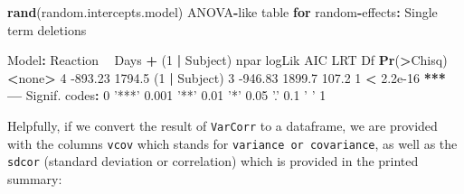 \documentclass[]{article}
\newenvironment{Shaded}{\begin{snugshade}}{\end{snugshade}}
\newcommand{\CommentTok}[1]{\textcolor[rgb]{0.56,0.35,0.01}{\textit{#1}}}
\newcommand{\ControlFlowTok}[1]{\textcolor[rgb]{0.13,0.29,0.53}{\textbf{#1}}}
\newcommand{\DataTypeTok}[1]{\textcolor[rgb]{0.13,0.29,0.53}{#1}}
\newcommand{\DecValTok}[1]{\textcolor[rgb]{0.00,0.00,0.81}{#1}}
\newcommand{\ErrorTok}[1]{\textcolor[rgb]{0.64,0.00,0.00}{\textbf{#1}}}
\newcommand{\FloatTok}[1]{\textcolor[rgb]{0.00,0.00,0.81}{#1}}
\newcommand{\KeywordTok}[1]{\textcolor[rgb]{0.13,0.29,0.53}{\textbf{#1}}}
\newcommand{\NormalTok}[1]{#1}
\newcommand{\OperatorTok}[1]{\textcolor[rgb]{0.81,0.36,0.00}{\textbf{#1}}}
\newcommand{\OtherTok}[1]{\textcolor[rgb]{0.56,0.35,0.01}{#1}}
\newcommand{\StringTok}[1]{\textcolor[rgb]{0.31,0.60,0.02}{#1}}
\begin{document}
\begin{Shaded}
\begin{Highlighting}[]
\KeywordTok{rand}\NormalTok{(random.intercepts.model)}
\NormalTok{ANOVA}\OperatorTok{-}\NormalTok{like table }\ControlFlowTok{for}\NormalTok{ random}\OperatorTok{-}\NormalTok{effects}\OperatorTok{:}\StringTok{ }\NormalTok{Single term deletions}

\NormalTok{Model}\OperatorTok{:}
\NormalTok{Reaction }\OperatorTok{~}\StringTok{ }\NormalTok{Days }\OperatorTok{+}\StringTok{ }\NormalTok{(}\DecValTok{1} \OperatorTok{|}\StringTok{ }\NormalTok{Subject)}
\NormalTok{              npar  logLik    AIC   LRT Df }\KeywordTok{Pr}\NormalTok{(}\OperatorTok{>}\NormalTok{Chisq)    }
\OperatorTok{<}\NormalTok{none}\OperatorTok{>}\StringTok{           }\DecValTok{4} \FloatTok{-893.23} \FloatTok{1794.5}                        
\NormalTok{(}\DecValTok{1} \OperatorTok{|}\StringTok{ }\NormalTok{Subject)    }\DecValTok{3} \FloatTok{-946.83} \FloatTok{1899.7} \FloatTok{107.2}  \DecValTok{1}  \OperatorTok{<}\StringTok{ }\FloatTok{2.2e-16} \OperatorTok{**}\ErrorTok{*}
\OperatorTok{---}
\NormalTok{Signif. codes}\OperatorTok{:}\StringTok{  }\DecValTok{0} \StringTok{'***'} \FloatTok{0.001} \StringTok{'**'} \FloatTok{0.01} \StringTok{'*'} \FloatTok{0.05} \StringTok{'.'} \FloatTok{0.1} \StringTok{' '} \DecValTok{1}
\end{Highlighting}
\end{Shaded}

Helpfully, if we convert the result of \texttt{VarCorr} to a dataframe, we are provided
with the columns \texttt{vcov} which stands for \texttt{variance\ or\ covariance}, as well as
the \texttt{sdcor} (standard deviation or correlation) which is provided in the printed
summary:

\begin{Shaded}
\end{Shaded}
\end{document}
